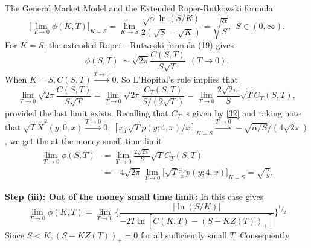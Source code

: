 \documentclass[unknownkeysallowed, compress]{beamer}
\newcommand*\rfrac[2]{{}^{#1}\!/_{#2}}
\theoremstyle{plain}
\begin{document}
\begin{frame}[allowframebreaks]{The General Market Model and the Extended Roper-Rutkowski formula}
\begin{equation}\label{33}
\bigg[\lim_{T\rightarrow 0}\phi(K,T)\bigg]_{K = S} = \lim_{K\rightarrow S}\frac{\sqrt{\alpha}\ln(S/K)}{2(\sqrt{S} - \sqrt{K})} = \sqrt{\frac{\alpha}{S}}, ~~ S\in(0,\infty).
\end{equation}
For $K = S$, the extended Roper - Rutwoski formula (19) gives 
$$
\phi(S,T)~\sim\sqrt{2\pi}\frac{C(S,T)}{S\sqrt{T}}~~(T\rightarrow 0).
$$
When $K = S,C(S,T)\stackrel{T\rightarrow 0}{\longrightarrow}0$. So L'Hopital's rule implies that 
$$
\lim_{T\rightarrow 0}\sqrt{2\pi}\frac{C(S,T)}{S\sqrt{T}} = \lim_{T\rightarrow 0}\sqrt{2\pi}\frac{C_T(S,T)}{S/(2\sqrt{T})} = \lim_{T\rightarrow 0}\frac{2\sqrt{2\pi}}{S}\sqrt{T}C_T(S,T),
$$
provided the last limit exists. Recalling that $C_T$ is given by \eqref{32} and taking note that $\sqrt{T}\tilde{X}^2(y;0,x)\stackrel{T\rightarrow 0}{\longrightarrow}0,~[x_T\sqrt{T}p(y;4,x)/x]_{K = S}\stackrel{T\rightarrow 0}{\longrightarrow}-\sqrt{\alpha/S}/(4\sqrt{2\pi})$, we get the at the money small time limit
\small
\begin{align*}
\lim_{T\rightarrow 0}\phi(S,T) &= \lim_{T\rightarrow 0}\frac{2\sqrt{2\pi}}{S}\sqrt{T}C_T(S,T) \\
&= -4\sqrt{2\pi}\lim_{T\rightarrow 0}\bigg[\sqrt{T}\frac{x_T}{x}p(y;4,x)\bigg]_{K = S} = \sqrt{\frac{\alpha}{S}}.
\end{align*}
\normalsize 

\textbf{Step (iii): Out of the money small time limit:} In this case %
gives
$$
\lim_{T\rightarrow 0}\phi(K,T) = \lim_{T\rightarrow 0}\bigg\{\frac{|\ln(S/K)|}{-2T\ln[C(K,T) - (S-KZ(T))_+]}\bigg\}^{\rfrac{1}{2}}
$$
Since $S<K,(S-KZ(T))_+ = 0$ for all sufficiently small $T$. Consequently


\end{frame}
\end{document}
